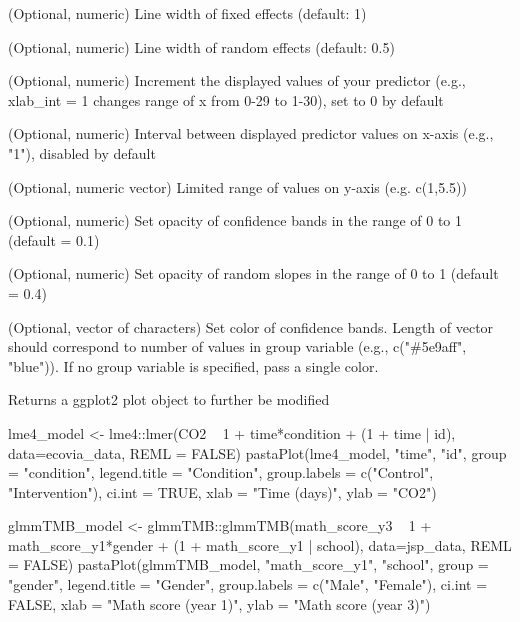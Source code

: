 \documentclass[a4paper]{book}
\begin{document}
\begin{Arguments}
\begin{ldescription}
\item[\code{lwd.fix}] (Optional, numeric) Line width of fixed effects (default: 1)

\item[\code{lwd.ran}] (Optional, numeric) Line width of random effects (default: 0.5)

\item[\code{xlab.inc}] (Optional, numeric) Increment the displayed values of your predictor (e.g., xlab\_int = 1 changes range of x from 0-29 to 1-30), set to 0 by default

\item[\code{xlab.int}] (Optional, numeric) Interval between displayed predictor values on x-axis (e.g., "1"), disabled by default

\item[\code{ylim}] (Optional, numeric vector) Limited range of values on y-axis (e.g. c(1,5.5))

\item[\code{opacity.ci}] (Optional, numeric) Set opacity of confidence bands in the range of 0 to 1 (default = 0.1)

\item[\code{opacity.ran}] (Optional, numeric) Set opacity of random slopes in the range of 0 to 1 (default = 0.4)

\item[\code{colors.ci}] (Optional, vector of characters) Set color of confidence bands. Length of vector should correspond to number of values in group variable (e.g., c("\#5e9aff", "blue")). If no group variable is specified, pass a single color.
\end{ldescription}
\end{Arguments}
%
\begin{Value}
Returns a ggplot2 plot object to further be modified
\end{Value}
%
\begin{Examples}
\begin{ExampleCode}
lme4_model <- lme4::lmer(CO2 ~ 1 + time*condition + (1 + time | id), data=ecovia_data, REML = FALSE)
pastaPlot(lme4_model, "time", "id", group = "condition", legend.title = "Condition", group.labels = c("Control", "Intervention"), ci.int = TRUE, xlab = "Time (days)", ylab = "CO2")

glmmTMB_model <- glmmTMB::glmmTMB(math_score_y3 ~ 1 + math_score_y1*gender + (1 + math_score_y1 | school), data=jsp_data, REML = FALSE)
pastaPlot(glmmTMB_model, "math_score_y1", "school", group = "gender", legend.title = "Gender", group.labels = c("Male", "Female"), ci.int = FALSE, xlab = "Math score (year 1)", ylab = "Math score (year 3)")
\end{ExampleCode}
\end{Examples}
\printindex{}
\end{document}
